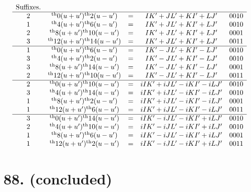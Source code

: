 \documentclass[11pt,a4paper]{book}
\providecommand{\uth}{\textsuperscript{th}}
\begin{document}
\[
\begin{array}{ccccc}
\text{Suffixes.} & & & & \\
\hline
2 & \uth{0}(u+u')\uth{2}(u-u') &=& IK' + JL' + KI' + LJ' & 0010 \\
1 & \uth{4}(u+u')\uth{6}(u-u') &=& IK' + JL' + KI' + LJ' & 0010 \\
2 & \uth{8}(u+u')\uth{10}(u-u') &=& IK' + JL' + KI' + LJ' & 0001 \\
3 & \uth{12}(u+u')\uth{14}(u-u') &=& IK' + JL' + KI' + LJ' & 0011 \\
\hline
1 & \uth{0}(u+u')\uth{6}(u-u') &=& IK' - JL' + KI' - LJ' & 0010 \\
3 & \uth{4}(u+u')\uth{2}(u-u') &=& IK' - JL' + KI' - LJ' & 0010 \\
3 & \uth{8}(u+u')\uth{14}(u-u') &=& IK' - JL' + KI' - LJ' & 0001 \\
2 & \uth{12}(u+u')\uth{10}(u-u') &=& IK' - JL' + KI' - LJ' & 0011 \\
\hline
2 & \uth{0}(u+u')\uth{10}(u-u') &=& iIK' + iJL' - iKI' - iLJ' & 0010 \\
3 & \uth{4}(u+u')\uth{14}(u-u') &=& iIK' + iJL' - iKI' - iLJ' & 0010 \\
1 & \uth{8}(u+u')\uth{2}(u-u') &=& iIK' + iJL' - iKI' - iLJ' & 0001 \\
1 & \uth{12}(u+u')\uth{6}(u-u') &=& iIK' + iJL' - iKI' - iLJ' & 0011 \\
\hline
3 & \uth{0}(u+u')\uth{14}(u-u') &=& iIK' - iJL' - iKI' + iLJ' & 0010 \\
2 & \uth{4}(u+u')\uth{10}(u-u') &=& iIK' - iJL' - iKI' + iLJ' & 0010 \\
1 & \uth{8}(u+u')\uth{6}(u-u') &=& iIK' - iJL' - iKI' + iLJ' & 0001 \\
1 & \uth{12}(u+u')\uth{2}(u-u') &=& iIK' - iJL' - iKI' + iLJ' & 0011
\end{array}
\]

\newpage
\section*{88. (concluded)}
\label{sec:88conc}
\end{document}
